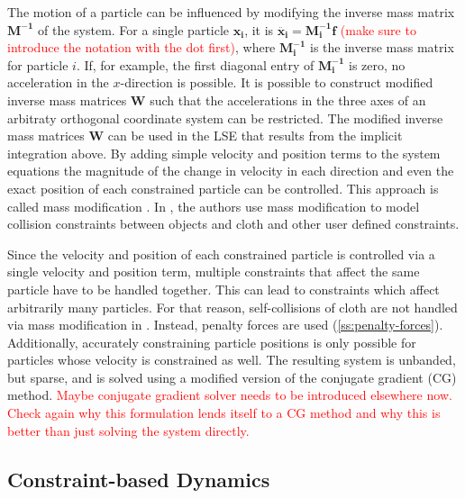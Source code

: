 The motion of a particle can be influenced by modifying the inverse mass matrix $\bm{M^{-1}}$ of the system. 
For a single particle $\bm{x_i}$, it is $\ddot{\bm{x_i}} = \bm{M_i^{-1} f}$ \textcolor{red}{(make sure to introduce the notation
with the dot first)}, where $\bm{M_i^{-1}}$ is the inverse mass matrix for particle $i$. If, for example, the first diagonal entry 
of $\bm{M_i^{-1}}$ is zero, no acceleration in the $x$-direction is possible. It is possible to construct modified inverse mass 
matrices $\bm{W}$ such that the accelerations in the three axes of an arbitraty orthogonal coordinate system can be restricted. 
The modified inverse mass matrices $\bm{W}$ can be used in the LSE that results from the implicit integration above. By adding 
simple velocity and position terms to the system equations the magnitude of the change in velocity in each direction and even the 
exact position of each constrained particle can be controlled. This approach is called mass modification \cite{baraff1998}. In 
\cite{baraff1998}, the authors use mass modification to model collision constraints between objects and cloth and other user 
defined constraints. 

Since the velocity and position of each constrained particle is controlled via a single velocity and position term, multiple 
constraints that affect the same particle have to be handled together. This can lead to constraints which affect arbitrarily many
particles. For that reason, self-collisions of cloth are not handled via mass modification in \cite{baraff1998}. Instead, penalty
forces are used (\cref{ss:penalty-forces}). Additionally, accurately constraining particle positions is only possible for particles 
whose velocity is constrained as well. The resulting system is unbanded, but sparse, and is solved using a modified version of the 
conjugate gradient (CG) method. \textcolor{red}{Maybe conjugate gradient solver needs to be introduced elsewhere now. Check again
why this formulation lends itself to a CG method and why this is better than just solving the system directly.}

\subsection{Constraint-based Dynamics}\label{ss:constraint-based-dynamics}

